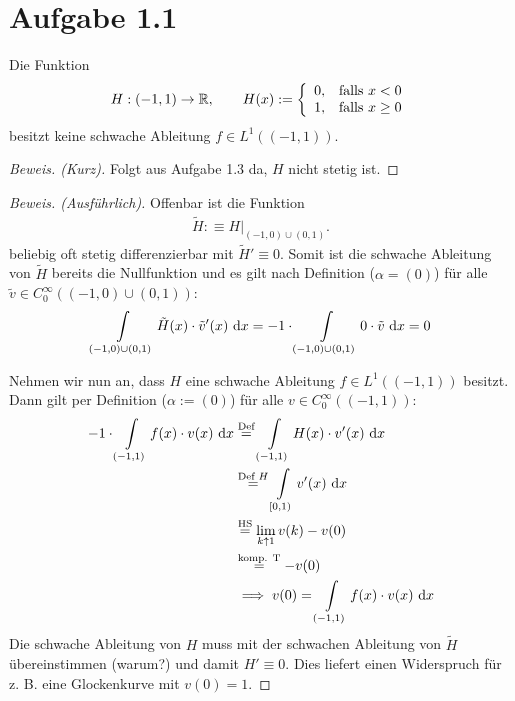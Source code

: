 \documentclass[12pt,a4paper]{article}
\author{Willi Sontopski}
\begin{document}

\section*{Aufgabe 1.1}
Die Funktion
\begin{align*}
H:(-1,1)\to\mathbb{R},\qquad H(x):=\left\lbrace\begin{array}{cl}
0, & \text{falls } x<0\\
1, & \text{falls } x\geq0
\end{array}\right.
\end{align*}
besitzt keine schwache Ableitung $f\in L^1((-1,1))$.
\begin{proof}[Beweis. (Kurz)]
Folgt aus Aufgabe 1.3 da, $H$ nicht stetig ist.
\end{proof}

\begin{proof}[Beweis. (Ausführlich)]
Offenbar ist die Funktion
\begin{align*}
\tilde{H}:\equiv H|_{(-1,0)\cup(0,1)}.
\end{align*}
beliebig oft stetig differenzierbar mit $\tilde{H}'\equiv0$. Somit ist die schwache Ableitung von $\tilde{H}$ bereits die Nullfunktion und es gilt nach Definition ($\alpha=(0)$) für alle $\tilde{v}\in C_0^\infty((-1,0)\cup(0,1))$:
\begin{align*}
\int\limits_{(-1,0)\cup(0,1)}\tilde{H}(x)\cdot \tilde{v}'(x)\text{ d} x=-1\cdot\int\limits_{(-1,0)\cup(0,1)} 0\cdot \tilde{v}\text{ d} x=0
\end{align*}

Nehmen wir nun an, dass $H$ eine schwache Ableitung $f\in L^1((-1,1))$ besitzt. Dann gilt per Definition ($\alpha:=(0)$) für alle $v\in C_0^\infty((-1,1))$:
\begin{align*}
-1\cdot\int\limits_{(-1,1)} f(x)\cdot v(x)\text{ d} x
&\stackrel{\text{Def}}{=}
\int\limits_{(-1,1)} H(x)\cdot v'(x)\text{ d} x\\
&\stackrel{\text{Def }H}{=}
\int\limits_{[0,1)} v'(x)\text{ d} x\\
&\stackrel{\text{HS}}{=}
\lim\limits_{k\uparrow 1} v(k)-v(0)\\
&\stackrel{\text{komp. T}}{=}
-v(0)\\
&\implies v(0)=\int\limits_{(-1,1)}f(x)\cdot v(x)\text{ d} x
\end{align*}
Die schwache Ableitung von $H$ muss mit der schwachen Ableitung von $\tilde{H}$ übereinstimmen (warum?) und damit $H'\equiv0$. Dies liefert einen Widerspruch für z. B. eine Glockenkurve mit $v(0)=1$.
\end{proof}
\end{document}

